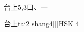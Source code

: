 \begin{entry}{台上}{5,3}{⼝、⼀}
  \begin{phonetics}{台上}{tai2 shang4}[][HSK 4]
  \end{phonetics}
\end{entry}
